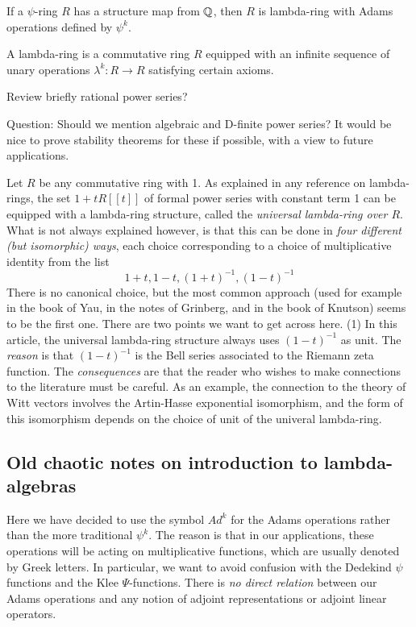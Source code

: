 \begin{lemma}
If a $\psi$-ring $R$ has a structure map from $\mathbb{Q}$, then $R$ is lambda-ring with Adams operations defined by $\psi^k$.
\end{lemma}


A lambda-ring is a commutative ring $R$ equipped with an infinite sequence of unary operations $\lambda^k: R \to R$ satisfying certain axioms. 




Review briefly rational power series?

Question: Should we mention algebraic and D-finite power series? It would be nice to prove stability theorems for these if possible, with a view to future applications.

\begin{remark}
Let $R$ be any commutative ring with 1. As explained in any reference on lambda-rings, the set $1 + t R[[t]]$ of formal power series with constant term 1 can be equipped with a lambda-ring structure, called the \emph{universal lambda-ring over $R$}. What is not always explained however, is that this can be done in \emph{four different (but isomorphic) ways}, each choice corresponding to a choice of multiplicative identity from the list
$$ 1+t, 1-t, (1+t)^{-1}, (1-t)^{-1} $$
There is no canonical choice, but the most common approach (used for example in the book of Yau, in the notes of Grinberg, and in the book of Knutson) seems to be the first one. There are two points we want to get across here. (1) In this article, the universal lambda-ring structure always uses $(1-t)^{-1}$ as unit. The \emph{reason} is that $(1-t)^{-1}$ is the Bell series associated to the Riemann zeta function. The \emph{consequences} are that the reader who wishes to make connections to the literature must be careful. As an example, the connection to the theory of Witt vectors involves the Artin-Hasse exponential isomorphism, and the form of this isomorphism depends on the choice of unit of the univeral lambda-ring.
\end{remark}



\subsection{Old chaotic notes on introduction to lambda-algebras}


\begin{remark}
Here we have decided to use the symbol $Ad^k$ for the Adams operations rather than the more traditional $\psi^k$. The reason is that in our applications, these operations will be acting on multiplicative functions, which are usually denoted by Greek letters. In particular, we want to avoid confusion with the Dedekind $\psi$ functions and the Klee $\Psi$-functions. There is \emph{no direct relation} between our Adams operations and any notion of adjoint representations or adjoint linear operators.
\end{remark}

